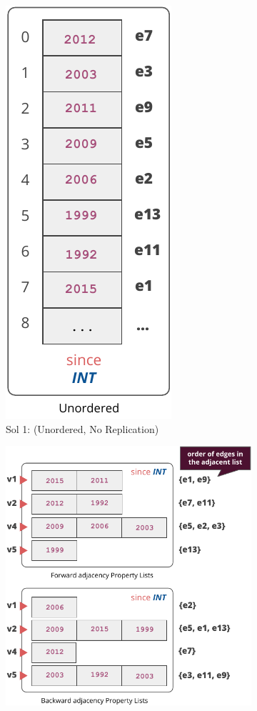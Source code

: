 \begin{figure}
	\vspace{-30pt}
	\hspace*{-20pt}
	\begin{subfigure}{0.45\textwidth}
		\vspace{20pt}
		\centering
		\includegraphics[scale=0.75]{img/sol1}
		\captionsetup{justification=centering}
		\vspace{10pt}
		\caption{Sol 1: (Unordered, No Replication)}
		\label{fig:sol1}
	\end{subfigure}
	\begin{subfigure}{0.55\textwidth}
		\centering
		\includegraphics[scale=0.75]{img/sol2}

\end{subfigure}
\end{figure}
